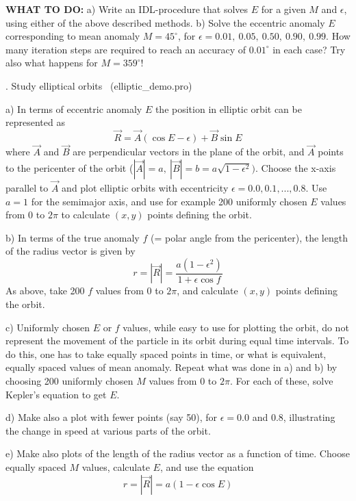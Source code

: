 \documentclass[a4paper,12pt]{article}
\begin{document}
{{{\bf WHAT TO DO:}  a) Write an IDL-procedure that solves $E$ for a given $M$
and $\epsilon$, using either of the above described methods.  b) Solve
the eccentric anomaly $E$ corresponding to mean anomaly $M= 45^\circ$,
for $\epsilon =0.01, \ 0.05, \ 0.50, \ 0.90, \ 0.99$. How many iteration steps
are required to reach an accuracy of $0.01^\circ$ in each case?
Try also what happens for $M=359^\circ$! 



\newpage

{. Study elliptical orbits} \ (elliptic\_demo.pro)


a) In terms of eccentric anomaly $E$ the position in elliptic orbit
can be represented as
\begin{equation}
\vec R = \vec A (\cos E - \epsilon) + \vec B \sin E
\label{eq_vec_r}
\end{equation}
\noindent where
$\vec A $ and $\vec B$ are perpendicular vectors in the plane of the orbit, and $\vec A$ points to the pericenter of the orbit ($|\vec A| = a, \  |\vec B| = b =a \sqrt{1-\epsilon^2}) $. Choose the x-axis parallel to $\vec A$ and plot
elliptic orbits with eccentricity $\epsilon=0.0, 0.1, ..., 0.8$.
Use $a=1$ for the semimajor axis, and use for example 200 uniformly chosen
$E$ values from $0$ to $2 \pi$ to calculate $(x,y)$ points defining the orbit.


b) In terms of the true anomaly $f$ (= polar angle from the pericenter), the length of the radius vector is given by
\begin{equation}
r = |\vec R| = \frac{a(1-\epsilon^2)}{1+\epsilon \cos f}
\end{equation}
\noindent As above, take 200 $f$ values from $0$ to $2 \pi$, and
calculate $(x,y)$ points defining the orbit.

c) Uniformly chosen $E$ or $f$ values, while easy to use for plotting the
orbit, do not represent the movement of the particle in its orbit
during equal time intervals. To do this, one has to take equally
spaced points in time, or what is equivalent, equally spaced values
of mean anomaly. Repeat what was done in a) and b) by choosing
200 uniformly chosen $M$ values from $0$ to $2 \pi$. For each of these,
solve Kepler's equation to get $E$.

d) Make also a plot with fewer points (say 50), for $\epsilon =0.0$ and $0.8$,
illustrating the change in speed at various parts of the orbit.


e) Make also plots of the length of the radius vector as a function of time.
Choose equally spaced $M$ values, calculate $E$, and use the equation
\begin{equation}
r = |\vec R| = a(1 - \epsilon \cos E)
\end{equation}

}}
\end{document}

